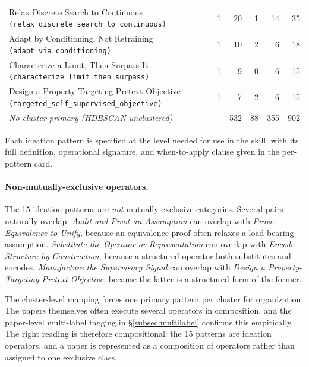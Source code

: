 \documentclass[10pt,a4paper]{article}
\begin{document}
\begin{table}[!htbp]
\begin{tabular}{p{7cm} c rrrr}
Relax Discrete Search to Continuous \texttt{(relax\_discrete\_search\_to\_continuous)} & 1 & 20 &  1 & 14 & 35 \\
Adapt by Conditioning, Not Retraining \texttt{(adapt\_via\_conditioning)}             & 1 & 10 &  2 &  6 & 18 \\
Characterize a Limit, Then Surpass It \texttt{(characterize\_limit\_then\_surpass)}   & 1 &  9 &  0 &  6 & 15 \\
Design a Property-Targeting Pretext Objective \texttt{(targeted\_self\_supervised\_objective)} & 1 &  7 &  2 &  6 & 15 \\
\midrule
\textit{No cluster primary (HDBSCAN-unclustered)} &  & 532 & 88 & 355 & 902 \\
\bottomrule
\end{tabular}
\end{table}

Each ideation pattern is specified at the level needed for use in the skill, with its full definition, operational signature, and when-to-apply clause given in the per-pattern card.

\paragraph{Non-mutually-exclusive operators.} The 15 ideation patterns are \emph{not} mutually exclusive categories. Several pairs naturally overlap. \emph{Audit and Pivot an Assumption} can overlap with \emph{Prove Equivalence to Unify}, because an equivalence proof often relaxes a load-bearing assumption. \emph{Substitute the Operator or Representation} can overlap with \emph{Encode Structure by Construction}, because a structured operator both substitutes and encodes. \emph{Manufacture the Supervisory Signal} can overlap with \emph{Design a Property-Targeting Pretext Objective}, because the latter is a structured form of the former.

The cluster-level mapping forces one primary pattern per cluster for organization. The papers themselves often execute several operators in composition, and the paper-level multi-label tagging in \S\ref{subsec:multilabel} confirms this empirically. The right reading is therefore compositional: the 15 patterns are ideation operators, and a paper is represented as a composition of operators rather than assigned to one exclusive class.
\end{document}
